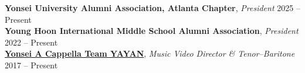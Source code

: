 \textbf{Yonsei University Alumni Association, Atlanta Chapter}, \textit{President} \hfill{2025 -- Present}\\
\textbf{Young Hoon International Middle School Alumni Association}, \textit{President} \hfill{2022 – Present}\\
\textbf{\href{https://youtube.com/playlist?list=PL5FL6N9wNenPc9hRKReFwUmUzUcqKgy9V&feature=shared}{Yonsei A Cappella Team YAYAN}}, \textit{Music Video Director \& Tenor–Baritone} \hfill{2017 -- Present}\\
